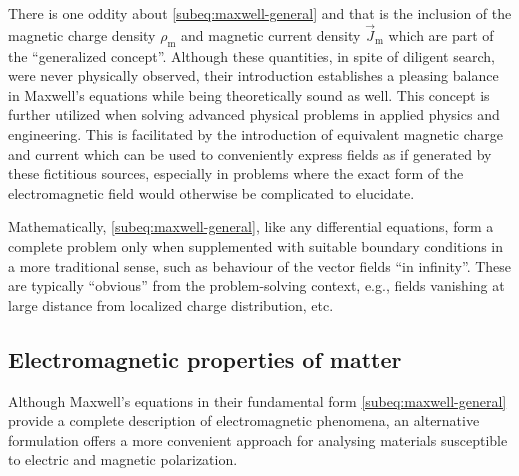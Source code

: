 \documentclass[11pt,a4paper,twoside,openany]{report}
\begin{document}
There is one oddity about \cref{subeq:maxwell-general} and that is the inclusion of the magnetic charge density $\rho_{\mathrm m}$ and magnetic current density $\vec J_{\mathrm m}$ which are part of the \enquote{generalized concept}. Although these quantities, in spite of diligent search, were never physically observed, their introduction establishes a pleasing balance in Maxwell's equations while being theoretically sound as well. This concept is further utilized when solving advanced physical problems in applied physics and engineering. This is facilitated by the introduction of equivalent magnetic charge and current which can be used to conveniently express fields as if generated by these fictitious sources, especially in problems where the exact form of the electromagnetic field would otherwise be complicated to elucidate.

Mathematically, \cref{subeq:maxwell-general}, like any differential equations, form a complete problem only when supplemented with suitable boundary conditions in a more traditional sense, such as behaviour of the vector fields \enquote{in infinity}. These are typically \enquote{obvious} from the problem-solving context, e.g., fields vanishing at large distance from localized charge distribution, etc.

\subsection{Electromagnetic properties of matter}
Although Maxwell's equations in their fundamental form \eqref{subeq:maxwell-general} provide a complete description of electromagnetic phenomena, an alternative formulation offers a more convenient approach for analysing materials susceptible to electric and magnetic polarization.
\end{document}
